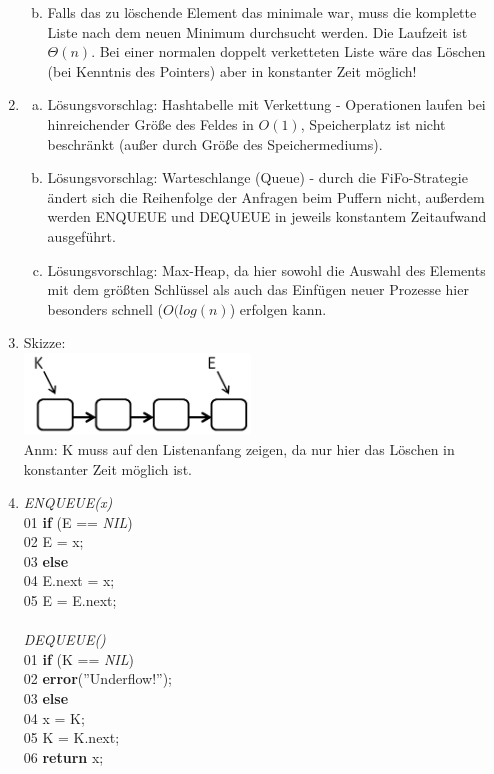 \documentclass{scrartcl}
\begin{document}
\begin{enumerate}[(1)]
\begin{enumerate}[(a)]
\begin{verbatim}
\end{verbatim}
\item Falls das zu l\"oschende Element das minimale war, muss die komplette Liste nach dem neuen Minimum durchsucht werden. Die Laufzeit ist $\Theta(n)$. Bei einer normalen doppelt verketteten Liste w\"are das L\"oschen (bei Kenntnis des Pointers) aber in konstanter Zeit m\"oglich!
\end{enumerate}

\item
\begin{enumerate}[(a)]
\item Lösungsvorschlag: Hashtabelle mit Verkettung - Operationen laufen bei hinreichender Größe des Feldes in $O(1)$, Speicherplatz ist nicht beschränkt (außer durch Größe des Speichermediums).
\item Lösungsvorschlag: Warteschlange (Queue) - durch die FiFo-Strategie ändert sich die Reihenfolge der Anfragen beim Puffern nicht, außerdem werden ENQUEUE und DEQUEUE in jeweils konstantem Zeitaufwand ausgeführt.
\item Lösungsvorschlag: Max-Heap, da hier sowohl die Auswahl des Elements mit dem größten Schlüssel als auch das Einfügen neuer Prozesse hier besonders schnell ($O(log(n)$) erfolgen kann. 
\end{enumerate}

\item Skizze: \\
	\includegraphics[width=6cm]{images/QueueListe}\\
	Anm: K muss auf den Listenanfang zeigen, da nur hier das Löschen in konstanter Zeit möglich ist.
\item \textit{ENQUEUE(x)}\\
	01 \tab \textbf{if} (E == \textit{NIL})\\
	02 \tab \tab E = x;\\
	03 \tab \textbf{else\\}
	04 \tab \tab  E.next = x;\\
	05 \tab \tab E = E.next;\\
	\ \\
	\textit{DEQUEUE()}\\
	01 \tab \textbf{if} (K == \textit{NIL})\\
	02 \tab \tab \textbf{error}(''Underflow!'');\\
	03 \tab \textbf{else}\\
	04 \tab \tab x = K;\\
	05 \tab \tab K = K.next;\\
	06 \tab \tab \textbf{return} x;

\end{enumerate}
\end{document}
